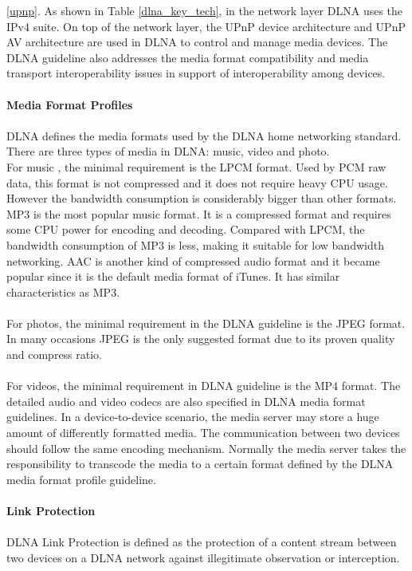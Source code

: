 \ref{upnp}.
As shown in Table \ref{dlna_key_tech}, in the network layer DLNA uses the IPv4
suite. On top of the network layer, the UPnP device architecture and UPnP AV architecture are used in DLNA to control
and manage media devices. The DLNA guideline also addresses the media format
compatibility and media transport interoperability issues in support of
interoperability among devices.\\
\\
\textbf{Media Format Profiles} \\ 
\\
DLNA defines the media formats used by the DLNA home networking 
standard. There are three types of media in DLNA: music, video and photo.\\
For music , the minimal requirement is the LPCM format. Used by PCM raw data,
this format is not compressed and it does not require heavy CPU usage. However
the bandwidth consumption is considerably bigger than other formats. MP3 is the
most popular music format. It is a compressed format and requires some CPU
power for encoding and decoding. Compared with LPCM, the bandwidth consumption
of MP3 is less, making it suitable for low bandwidth networking. AAC is another
kind of compressed audio format and it became popular since it is the default
media format of iTunes. It has similar characteristics as MP3. \\
\\
For photos, the minimal requirement in the DLNA guideline is the JPEG format. In
many occasions JPEG is the only suggested format due to its proven quality and
compress ratio. \\
\\
For videos, the minimal requirement in DLNA guideline is the MP4 format. The
detailed audio and video codecs are also specified in DLNA media format
guidelines. In a device-to-device scenario, the media server may store a huge
amount of differently formatted media. The communication between two devices
should follow the same encoding mechanism. Normally the media server takes the
responsibility to transcode the media to a certain format defined by the DLNA
media format profile guideline.\\
\\
\textbf{Link Protection} \\ 
\\
DLNA Link Protection is defined as the protection of a content stream between two 
devices on a DLNA network against illegitimate observation or interception. \\
